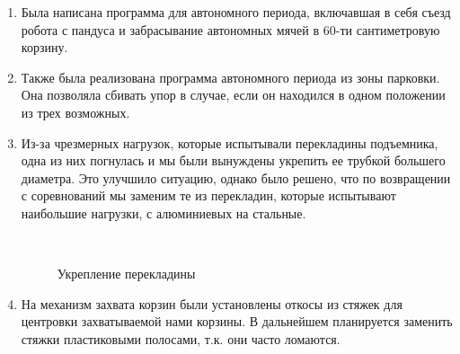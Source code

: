 \begin{enumerate}
	\item Была написана программа для автономного периода, включавшая в себя съезд робота с пандуса и забрасывание автономных мячей в 60-ти сантиметровую корзину.
	
	\item Также была реализована программа автономного периода из зоны парковки. Она позволяла сбивать упор в случае, если он находился в одном положении из трех возможных.
	
	\item Из-за чрезмерных нагрузок, которые испытывали перекладины подъемника, одна из них погнулась и мы были вынуждены укрепить ее трубкой большего диаметра. Это улучшило ситуацию, однако было решено, что по возвращении с соревнований мы заменим те из перекладин, которые испытывают наибольшие нагрузки, с алюминиевых на стальные.
	
	\begin{figure}[H]
		\begin{minipage}[h]{0.2\linewidth}
			\center  
		\end{minipage}
		\begin{minipage}[h]{0.6\linewidth}
			\caption{Укрепление перекладины}
		\end{minipage}
	\end{figure}
	
	\item На механизм захвата корзин были установлены откосы из стяжек для центровки захватываемой нами корзины. В дальнейшем планируется заменить стяжки  пластиковыми полосами, т.к. они часто ломаются.
	

\end{enumerate}
